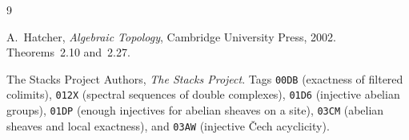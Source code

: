 \documentclass[11pt]{article}
\theoremstyle{definition}
\theoremstyle{remark}
\begin{document}
\begin{thebibliography}{9}

A.~Hatcher,
\emph{Algebraic Topology},
Cambridge University Press, 2002.
Theorems~2.10 and~2.27.

The Stacks Project Authors,
\emph{The Stacks Project}.
Tags \texttt{00DB} (exactness of filtered colimits),
\texttt{012X} (spectral sequences of double complexes),
\texttt{01D6} (injective abelian groups),
\texttt{01DP} (enough injectives for abelian sheaves on a site),
\texttt{03CM} (abelian sheaves and local exactness), and
\texttt{03AW} (injective \v{C}ech acyclicity).

\end{thebibliography}
\end{document}
